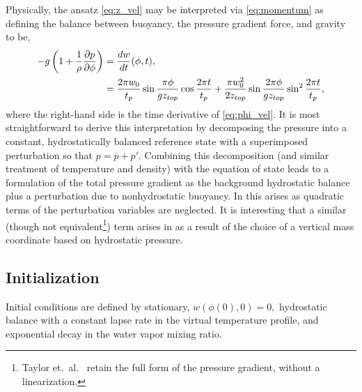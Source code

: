 Physically, the ansatz \eqref{eq:z_vel} may be interpreted via \eqref{eq:momentum} as defining the balance between buoyancy, the pressure gradient force, and gravity to be,
\begin{align}
  -g\left(1 +  \frac{1}{\rho}\frac{\partial p }{\partial \phi}\right) &= \frac{ d w}{d t}(\phi,t), \notag \\
  &= \frac{2\pi w_0}{t_p}\sin\frac{\pi\phi}{gz_{top}}\cos\frac{2\pi t}{t_p} + \frac{\pi w_0^2}{2z_{top}}\sin\frac{2\pi\phi}{gz_{top}}\sin^2\frac{2\pi t}{t_p},
\end{align}
where the right-hand side is the time derivative of \eqref{eq:phi_vel}.
It is most straightforward to derive this interpretation by decomposing the pressure into a constant, hydrostatically balanced reference state with a superimposed perturbation \cite{KlempWilhelmson1978,Srivastava1967,SoongOgura1973} so that $p = \overline{p} + p'$.
Combining this decomposition (and similar treatment of temperature and density) with the equation of state leads to a formulation of the total pressure gradient as the background hydrostatic balance plus a perturbation due to nonhydrostatic buoyancy.  
In \cite{KlempWilhelmson1978,Srivastava1967,SoongOgura1973} this arises as quadratic terms of the perturbation variables are neglected.  
It is interesting that a similar (though not equivalent\footnote{Taylor et.~al.~\cite{Taylor2020} retain the full form of the pressure gradient, without a linearization.}) term arises in \cite{Taylor2020} as a result of the choice of a vertical mass coordinate based on hydrostatic pressure.
  
\subsection{Initialization}

Initial conditions are defined by stationary, $w(\phi(0),0) = 0,$ hydrostatic balance with a constant lapse rate in the virtual temperature profile, and exponential decay in the water vapor mixing ratio.

